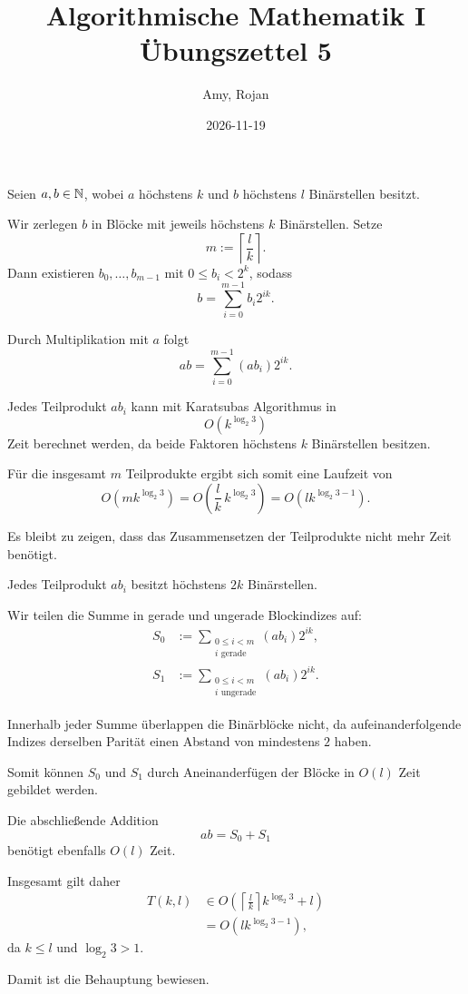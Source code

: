 \documentclass{report}
\title{\huge{Algorithmische Mathematik I \\ Übungszettel 5}}
\author{\huge{Amy, Rojan}}
\date{2026-11-19}
\begin{document}
\maketitle



\begin{myproof}
  Seien $a,b\in\mathbb{N}$, wobei $a$ höchstens $k$
  und $b$ höchstens $l$ Binärstellen besitzt.

  Wir zerlegen $b$ in Blöcke mit jeweils
  höchstens $k$ Binärstellen. Setze
  \[
    m:=\left\lceil\frac lk\right\rceil.
  \]
  Dann existieren $b_0,\dots,b_{m-1}$ mit
  $0\le b_i<2^k$, sodass
  \[
    b=\sum_{i=0}^{m-1}b_i2^{ik}.
  \]

  Durch Multiplikation mit $a$ folgt
  \[
    ab=\sum_{i=0}^{m-1}(ab_i)2^{ik}.
  \]

  Jedes Teilprodukt $ab_i$ kann mit Karatsubas
  Algorithmus in
  \[
    O(k^{\log_2 3})
  \]
  Zeit berechnet werden, da beide Faktoren
  höchstens $k$ Binärstellen besitzen.

  Für die insgesamt $m$ Teilprodukte ergibt sich
  somit eine Laufzeit von
  \[
    O\left(mk^{\log_2 3}\right)
    =
    O\left(\frac lk\,k^{\log_2 3}\right)
    =
    O\left(lk^{\log_2 3-1}\right).
  \]

  Es bleibt zu zeigen, dass das Zusammensetzen
  der Teilprodukte nicht mehr Zeit benötigt.

  Jedes Teilprodukt $ab_i$ besitzt höchstens
  $2k$ Binärstellen.

  Wir teilen die Summe in gerade und ungerade
  Blockindizes auf:
  \begin{align*}
    S_0&:=\sum_{\substack{0\le i<m\\i\text{ gerade}}}
      (ab_i)2^{ik},\\
    S_1&:=\sum_{\substack{0\le i<m\\i\text{ ungerade}}}
      (ab_i)2^{ik}.
  \end{align*}

  Innerhalb jeder Summe überlappen die
  Binärblöcke nicht, da aufeinanderfolgende
  Indizes derselben Parität einen Abstand
  von mindestens $2$ haben.

  Somit können $S_0$ und $S_1$ durch
  Aneinanderfügen der Blöcke in $O(l)$
  Zeit gebildet werden.

  Die abschließende Addition
  \[
    ab=S_0+S_1
  \]
  benötigt ebenfalls $O(l)$ Zeit.

  Insgesamt gilt daher
  \begin{align*}
    T(k,l)
    &\in O\left(
      \left\lceil\frac lk\right\rceil
      k^{\log_2 3}+l
    \right)\\
    &=O\left(lk^{\log_2 3-1}\right),
  \end{align*}
  da $k\le l$ und $\log_2 3>1$.

  Damit ist die Behauptung bewiesen.
\end{myproof}
\end{document}
